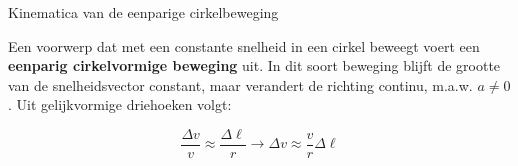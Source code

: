 \begin{theo}{Kinematica van de eenparige cirkelbeweging}
    \vspace{-0.4cm}
    \begin{minipage}{.71\textwidth}
        Een voorwerp dat met een constante snelheid in een cirkel beweegt voert een \textbf{eenparig cirkelvormige beweging} uit. In dit soort beweging blijft de grootte van de snelheidsvector constant, maar verandert de richting continu, m.a.w. $ a \neq 0 $. Uit gelijkvormige driehoeken volgt: 
    
        \begin{equation*}
            \frac{\Delta v}{v} \approx \frac{\Delta \ell}{r} \to \Delta v \approx \frac{v}{r}\Delta \ell
        \end{equation*}

        

\end{minipage}
\end{theo}
